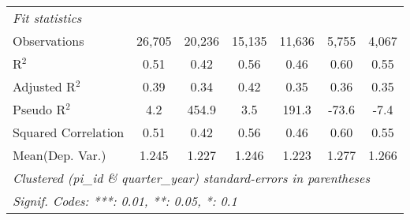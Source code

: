 \begin{tabular}{lcccccc}
   \midrule
   \emph{Fit statistics}\\
   Observations                                               & 26,705        & 20,236        & 15,135       & 11,636      & 5,755       & 4,067\\  
   R$^2$                                                      & 0.51          & 0.42          & 0.56         & 0.46        & 0.60        & 0.55\\  
   Adjusted R$^2$                                             & 0.39          & 0.34          & 0.42         & 0.35        & 0.36        & 0.35\\  
   Pseudo R$^2$                                               & 4.2           & 454.9         & 3.5          & 191.3       & -73.6       & -7.4\\  
   Squared Correlation                                        & 0.51          & 0.42          & 0.56         & 0.46        & 0.60        & 0.55\\  
Mean(Dep. Var.) & 1.245 & 1.227 & 1.246 & 1.223 & 1.277 & 1.266 \\
   \midrule \midrule
   \multicolumn{7}{l}{\emph{Clustered (pi\_id \& quarter\_year) standard-errors in parentheses}}\\
   \multicolumn{7}{l}{\emph{Signif. Codes: ***: 0.01, **: 0.05, *: 0.1}}\\
\end{tabular}
\par\endgroup
